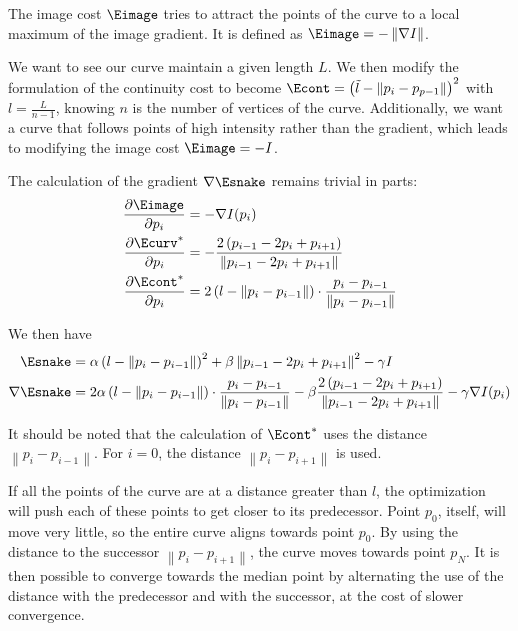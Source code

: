The image cost $\Eimage$ tries to attract the points of the curve to a local maximum of the image gradient. It is defined as $\Eimage = - \left\| \nabla I \right\| $.

We want to see our curve maintain a given length $L$. We then modify the formulation of the continuity cost to become $\Econt = \left(\tilde{l} - \left\|p_i - p_{p-1} \right\| \right)^2$ with $l = \frac{L}{n - 1}$, knowing $n$ is the number of vertices of the curve. Additionally, we want a curve that follows points of high intensity rather than the gradient, which leads to modifying the image cost $\Eimage = -I$.

The calculation of the gradient $\nabla \Esnake$ remains trivial in parts:
\begin{align}
    \frac{\partial \Eimage}{\partial p_i} &= - \nabla I(p_i) \\
    \frac{\partial \Ecurv^{*}}{\partial p_i} &= -\frac{2 \left( p_{i-1} - 2 p_i + p_{i+1} \right) }{ \left\| p_{i-1} - 2 p_i + p_{i+1} \right\| } \\
    \frac{\partial \Econt^{*}}{\partial p_i} &= 2 \left(l - \left\|p_i - p_{i-1} \right\| \right) \cdot \frac{p_i - p_{i-1}}{ \left\| p_i - p_{i-1} \right\| }
\end{align}

We then have
\begin{align}
    \Esnake &= \alpha \left(l - \left\|p_i - p_{i-1} \right\| \right)^2 + \beta \left\| p_{i-1} - 2 p_i + p_{i+1} \right\| ^2 - \gamma I \\
    \nabla \Esnake &= 2 \alpha \left(l - \left\|p_i - p_{i-1} \right\| \right) \cdot \frac{p_i - p_{i-1}}{ \left\| p_i - p_{i-1} \right\| } - \beta \frac{2 \left( p_{i-1} - 2 p_i + p_{i+1} \right) }{ \left\| p_{i-1} - 2 p_i + p_{i+1} \right\| } - \gamma \nabla I(p_i)
\end{align}

It should be noted that the calculation of $\Econt^{*}$ uses the distance $\left\|p_i - p_{i - 1} \right\|$. For $i = 0$, the distance $\left\| p_i - p_{i + 1} \right\|$ is used.

If all the points of the curve are at a distance greater than $l$, the optimization will push each of these points to get closer to its predecessor. Point $p_0$, itself, will move very little, so the entire curve aligns towards point $p_0$. By using the distance to the successor $\left\| p_i - p_{i+1} \right\|$, the curve moves towards point $p_N$.
It is then possible to converge towards the median point by alternating the use of the distance with the predecessor and with the successor, at the cost of slower convergence.

